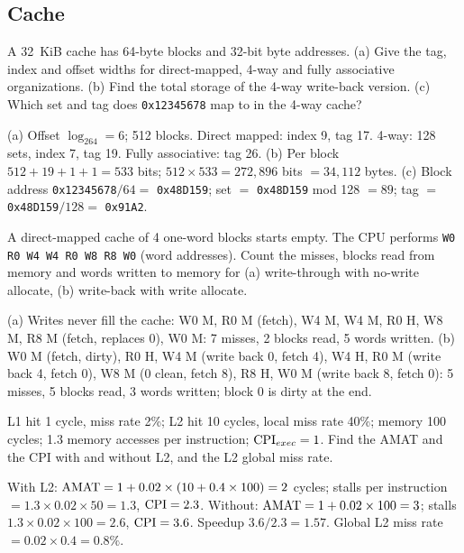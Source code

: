 \subsection{Cache}

\begin{exercise}
A 32~KiB cache has 64-byte blocks and 32-bit byte addresses. (a) Give the tag, index
and offset widths for direct-mapped, 4-way and fully associative organizations.
(b) Find the total storage of the 4-way write-back version. (c) Which set and tag
does \texttt{0x12345678} map to in the 4-way cache?
\end{exercise}
\begin{solution}
(a) Offset $\log_264=6$; 512 blocks. Direct mapped: index 9, tag 17. 4-way: 128 sets,
index 7, tag 19. Fully associative: tag 26. (b) Per block $512+19+1+1=533$ bits;
$512\times533=272{,}896$ bits $=34{,}112$ bytes. (c) Block address
\texttt{0x12345678}$/64=$ \texttt{0x48D159}; set $=$ \texttt{0x48D159} mod 128 $=89$;
tag $=$ \texttt{0x48D159}$/128=$ \texttt{0x91A2}.
\end{solution}

\begin{exercise}
A direct-mapped cache of 4 one-word blocks starts empty. The CPU performs
\texttt{W0 R0 W4 W4 R0 W8 R8 W0} (word addresses). Count the misses, blocks read from
memory and words written to memory for (a) write-through with no-write allocate,
(b) write-back with write allocate.
\end{exercise}
\begin{solution}
(a) Writes never fill the cache: W0 M, R0 M (fetch), W4 M, W4 M, R0 H, W8 M, R8 M
(fetch, replaces 0), W0 M: 7 misses, 2 blocks read, 5 words written. (b) W0 M (fetch,
dirty), R0 H, W4 M (write back 0, fetch 4), W4 H, R0 M (write back 4, fetch 0), W8 M
(0 clean, fetch 8), R8 H, W0 M (write back 8, fetch 0): 5 misses, 5 blocks read,
3 words written; block 0 is dirty at the end.
\end{solution}

\begin{exercise}
L1 hit 1 cycle, miss rate 2\%; L2 hit 10 cycles, local miss rate 40\%; memory 100
cycles; 1.3 memory accesses per instruction; $\mathrm{CPI}_{exec}=1$. Find the AMAT and the
CPI with and without L2, and the L2 global miss rate.
\end{exercise}
\begin{solution}
With L2: $\mathrm{AMAT}=1+0.02\times(10+0.4\times100)=2$ cycles; stalls per instruction
$=1.3\times0.02\times50=1.3$, $\mathrm{CPI}=2.3$. Without: $\mathrm{AMAT}=1+0.02\times100=3$;
stalls $1.3\times0.02\times100=2.6$, $\mathrm{CPI}=3.6$. Speedup $3.6/2.3=1.57$. Global L2
miss rate $=0.02\times0.4=0.8\%$.
\end{solution}

